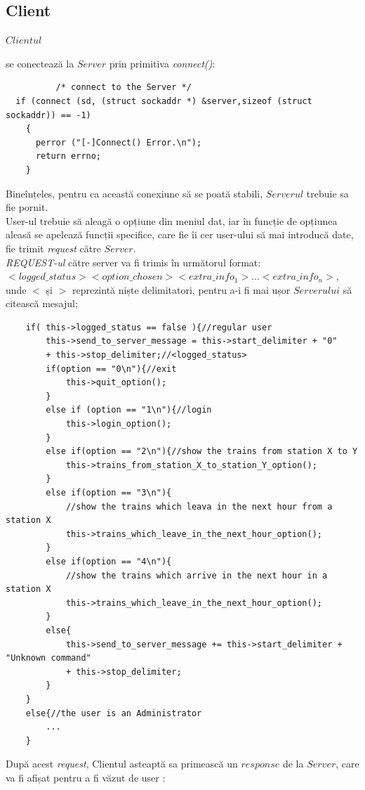 \documentclass[runningheads]{llncs}
\begin{document}
 \subsection{Client}
\hypertarget{sec:detailsConnect}{$Clientul$} se conectează la $Server$ prin primitiva \textit{connect()}:

    \begin{verbatim}
          /* connect to the Server */
  if (connect (sd, (struct sockaddr *) &server,sizeof (struct sockaddr)) == -1)
    {
      perror ("[-]Connect() Error.\n");
      return errno;
    }
    \end{verbatim}
 Bineînțeles, pentru ca această conexiune să se poată stabili, $Serverul$ trebuie sa fie pornit.\\
 User-ul trebuie să aleagă o opțiune din meniul dat, iar în funcție de opțiunea aleasă se apelează funcții specifice, care fie îi cer user-ului să mai introducă date, fie trimit \textit{request} către $Server$.\\
 \textit{REQUEST-ul} către server va fi trimis în următorul format:\\
 $<logged\_status><option\_chosen><extra\_info_1>...<extra\_info_n>$, unde $<$ și $>$ reprezintă niște delimitatori, pentru a-i fi mai ușor $Serverului$ să citească mesajul;
  \begin{verbatim}
    if( this->logged_status == false ){//regular user
        this->send_to_server_message = this->start_delimiter + "0" 
        + this->stop_delimiter;//<logged_status>
        if(option == "0\n"){//exit
            this->quit_option();
        }
        else if (option == "1\n"){//login
            this->login_option();
        }
        else if(option == "2\n"){//show the trains from station X to Y
            this->trains_from_station_X_to_station_Y_option();
        }
        else if(option == "3\n"){
            //show the trains which leava in the next hour from a station X
            this->trains_which_leave_in_the_next_hour_option();
        }
        else if(option == "4\n"){
            //show the trains which arrive in the next hour in a station X
            this->trains_which_leave_in_the_next_hour_option();
        }
        else{
            this->send_to_server_message += this->start_delimiter + "Unknown command" 
            + this->stop_delimiter;
        }
    }
    else{//the user is an Administrator
        ...
    }
    \end{verbatim}
 După acest \textit{request}, Clientul asteaptă sa primească un $response$ de la $Server$, care va fi afișat pentru a fi văzut de user : 
\end{document}
